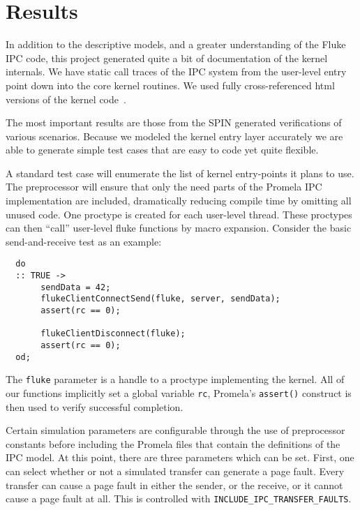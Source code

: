 %
%
%

\section{Results}
\label{results}

In addition to the descriptive models, and a greater understanding of
the Fluke IPC code, this project generated quite a bit of
documentation of the kernel internals. We have static call traces of
the IPC system from the user-level entry point down into the core
kernel routines. We used fully cross-referenced html versions of the
kernel code~\cite{godmars-html}.

The most important results are those from the SPIN generated
verifications of various scenarios.  Because we modeled the kernel
entry layer accurately we are able to
generate simple test cases that are easy to code yet quite flexible.

A standard test case will enumerate the list of kernel entry-points it
plans to use. The preprocessor will ensure that only the need parts
of the Promela IPC implementation are included, dramatically reducing
compile time by omitting all unused code. One proctype is created for 
each user-level thread. These proctypes can then ``call'' user-level 
fluke functions by macro expansion. Consider the basic send-and-receive
test as an example: 

\begin{verbatim}
  do
  :: TRUE ->
       sendData = 42;
       flukeClientConnectSend(fluke, server, sendData);
       assert(rc == 0);

       flukeClientDisconnect(fluke);
       assert(rc == 0);
  od;
\end{verbatim}

The {\tt fluke} parameter is a handle to a proctype implementing the 
kernel.  All of our functions implicitly set a global variable 
{\tt rc}, Promela's {\tt assert()} construct is then used to verify
successful completion.

Certain simulation parameters are configurable through the use
of preprocessor constants before including the Promela files that
contain the definitions of the IPC model. At this point, there are three
parameters which can be set. First, one can select whether or not 
a simulated transfer can generate a page fault. Every transfer can 
cause a page fault in either the sender, or the receive, or it cannot
cause a page fault at all. This is controlled with 
{\tt INCLUDE_IPC_TRANSFER_FAULTS}.

